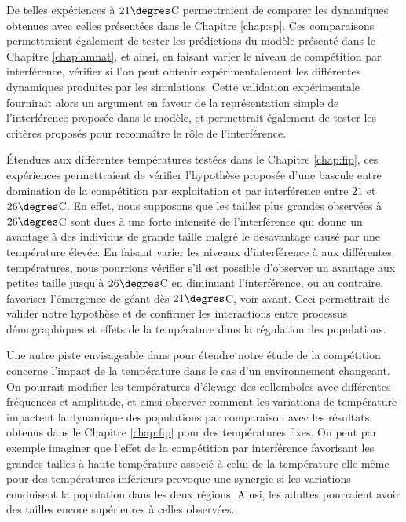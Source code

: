 De telles expériences à $21\degres$C permettraient de comparer les dynamiques
obtenues avec celles présentées dans le Chapitre \ref{chap:sp}. Ces
comparaisons permettraient également de tester les prédictions du modèle
présenté dans le Chapitre \ref{chap:amnat}, et ainsi, en faisant varier le
niveau de compétition par interférence, vérifier si l'on peut obtenir
expérimentalement les différentes dynamiques produites par les simulations.
Cette validation expérimentale fournirait alors un argument en faveur de la
représentation simple de l'interférence proposée dans le modèle, et permettrait
également de tester les critères proposés pour reconnaître le rôle de
l'interférence. 

Étendues aux différentes températures testées dans le Chapitre \ref{chap:fip},
ces expériences permettraient de vérifier l'hypothèse proposée d'une bascule
entre domination de la compétition par exploitation et par interférence entre
$21$ et $26\degres$C. En effet, nous supposons que les tailles plus grandes
observées à $26\degres$C sont dues à une forte intensité de l'interférence qui
donne un avantage à des individus de grande taille malgré le désavantage causé
par une température élevée. En faisant varier les niveaux d'interférence à
aux différentes températures, nous pourrions vérifier s'il est possible
d'observer un avantage aux petites taille jusqu'à $26\degres$C en diminuant
l'interférence, ou au contraire, favoriser l'émergence de géant dès
$21\degres$C, voir avant. Ceci permettrait de valider notre hypothèse et de
confirmer les interactions entre processus démographiques et effets de la
température dans la régulation des populations.

Une autre piste envisageable dans pour étendre notre étude de la compétition
concerne l'impact de la température dans le cas d'un environnement changeant. On
pourrait modifier les températures d'élevage des collemboles avec différentes
fréquences et amplitude, et ainsi observer comment les variations de température
impactent la dynamique des populations par comparaison avec les résultats
obtenus dans le Chapitre \ref{chap:fip} pour des températures fixes. On peut par
exemple imaginer que l'effet de la compétition par interférence favorisant les
grandes tailles à haute température associé à celui de la température elle-même
pour des températures inférieurs provoque une synergie si les variations
conduisent la population dans les deux régions. Ainsi, les adultes pourraient
avoir des tailles encore supérieures à celles observées.


